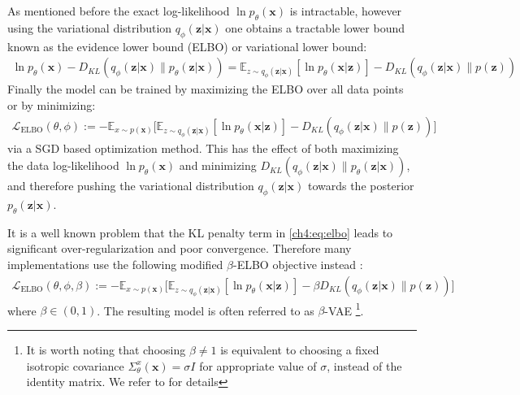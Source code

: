 As mentioned before the exact log-likelihood $\ln p_{\theta}(\textbf{x})$ is intractable, however using the variational distribution $q_\phi( \textbf{z} | \textbf{x})$ one obtains a tractable lower bound known as the evidence lower bound (ELBO) or variational lower bound:
\begin{gather*}
    \ln p_\theta(\textbf{x}) - D_{KL}( q_\phi( \textbf{z} | \textbf{x}) \parallel p_\theta( \textbf{z} | \textbf{x})) =  \mathbb{E}_{z \sim q_\phi( \textbf{z} | \textbf{x})}[\ln p_\theta(\textbf{x} | \textbf{z})] - D_{KL}( q_\phi( \textbf{z} | \textbf{x}) \parallel p( \textbf{z}))
\end{gather*}
Finally the model can be trained by maximizing the ELBO over all data points or by minimizing:
\begin{gather}
\label{ch4:eq:elbo}
    \mathcal{L}_{\text{ELBO}}(\theta, \phi) := -\mathbb{E}_{x \sim p(\textbf{x})} \big[ \mathbb{E}_{z \sim q_\phi( \textbf{z} | \textbf{x})}[\ln p_\theta(\textbf{x} | \textbf{z})] - D_{KL}( q_\phi( \textbf{z} | \textbf{x}) \parallel p( \textbf{z})) \big]
\end{gather}
via a SGD based optimization method.
This has the effect of both maximizing the data log-likelihood $\ln p_\theta(\textbf{x})$ and minimizing $D_{KL}( q_\phi( \textbf{z} | \textbf{x}) \parallel p_\theta( \textbf{z} | \textbf{x}))$, and therefore pushing the variational distribution $q_\phi( \textbf{z} | \textbf{x})$ towards the posterior $ p_\theta( \textbf{z} | \textbf{x})$.

It is a well known problem that the KL penalty term in \ref{ch4:eq:elbo} leads to significant over-regularization and poor convergence. Therefore many implementations use the following modified $\beta$-ELBO objective instead \cite{higgins2016beta_vae}:
\begin{gather}
\label{ch4:eq:elbo}
    \mathcal{L}_{\text{ELBO}}(\theta, \phi, \beta) := -\mathbb{E}_{x \sim p(\textbf{x})} \big[ \mathbb{E}_{z \sim q_\phi( \textbf{z} | \textbf{x})}[\ln p_\theta(\textbf{x} | \textbf{z})] - \beta D_{KL}( q_\phi( \textbf{z} | \textbf{x}) \parallel p( \textbf{z})) \big]
\end{gather}
where $\beta \in (0,1)$. The resulting model is often referred to as $\beta$-VAE \footnote{It is worth noting that choosing $\beta \not = 1$ is equivalent to choosing a fixed isotropic covariance $\Sigma^x_\theta(\textbf{x}) = \sigma I$ for appropriate value of $\sigma$, instead of the identity matrix. We refer to \cite{rybkin2021sigma_vae} for details}.

